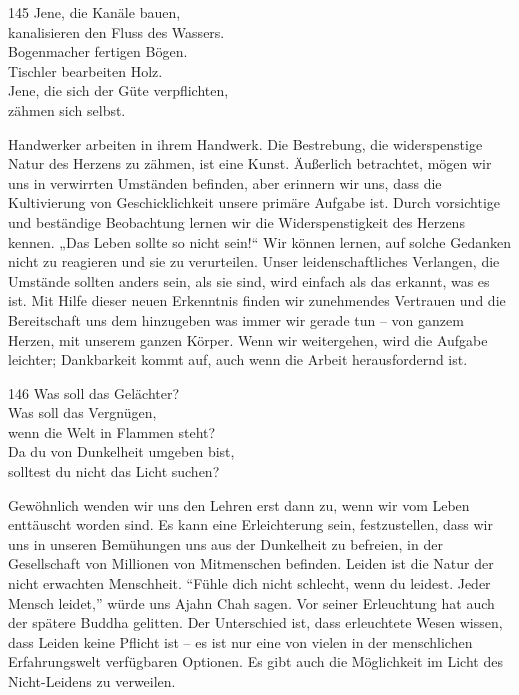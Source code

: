 
\begin{dhpVerse}{145}
\label{dhp-145}
Jene, die Kanäle bauen,\\ 
kanalisieren den Fluss des Wassers.\\ 
Bogenmacher fertigen Bögen.\\ 
Tischler bearbeiten Holz.\\ 
Jene, die sich der Güte verpflichten,\\ 
zähmen sich selbst. 
\end{dhpVerse}

\begin{dhpRefl}

Handwerker arbeiten in ihrem Handwerk. Die Bestrebung, die widerspenstige
Natur des Herzens zu zähmen, ist eine Kunst. Äußerlich betrachtet, mögen wir
uns in verwirrten Umständen befinden, aber erinnern wir uns, dass die
Kultivierung von Geschicklichkeit unsere primäre Aufgabe ist. Durch
vorsichtige und beständige Beobachtung lernen wir die Widerspenstigkeit des
Herzens kennen. „Das Leben sollte so nicht sein!“ Wir können lernen, auf
solche Gedanken nicht zu reagieren und sie zu verurteilen. Unser
leidenschaftliches Verlangen, die Umstände sollten anders sein, als sie sind,
wird einfach als das erkannt, was es ist. Mit Hilfe dieser neuen Erkenntnis
finden wir zunehmendes Vertrauen und die Bereitschaft uns dem hinzugeben was
immer wir gerade tun -- von ganzem Herzen, mit unserem ganzen Körper. Wenn wir
weitergehen, wird die Aufgabe leichter; Dankbarkeit kommt auf, auch wenn die
Arbeit herausfordernd ist.

\end{dhpRefl}


\begin{dhpVerse}{146}
\label{dhp-146}
Was soll das Gelächter?\\ 
Was soll das Vergnügen,\\ 
wenn die Welt in Flammen steht?\\ 
Da du von Dunkelheit umgeben bist,\\ 
solltest du nicht das Licht suchen? 
\end{dhpVerse}

\begin{dhpRefl}

Gewöhnlich wenden wir uns den Lehren erst dann zu, wenn wir vom Leben
enttäuscht worden sind. Es kann eine Erleichterung sein, festzustellen, dass
wir uns in unseren Bemühungen uns aus der Dunkelheit zu befreien, in der
Gesellschaft von Millionen von Mitmenschen befinden. Leiden ist die Natur der
nicht erwachten Menschheit. “Fühle dich nicht schlecht, wenn du leidest. Jeder
Mensch leidet,” würde uns Ajahn Chah sagen. Vor seiner Erleuchtung hat auch
der spätere Buddha gelitten. Der Unterschied ist, dass erleuchtete Wesen
wissen, dass Leiden keine Pflicht ist -- es ist nur eine von vielen in der
menschlichen Erfahrungswelt verfügbaren Optionen. Es gibt auch die Möglichkeit
im Licht des Nicht-Leidens zu verweilen.

\end{dhpRefl}

